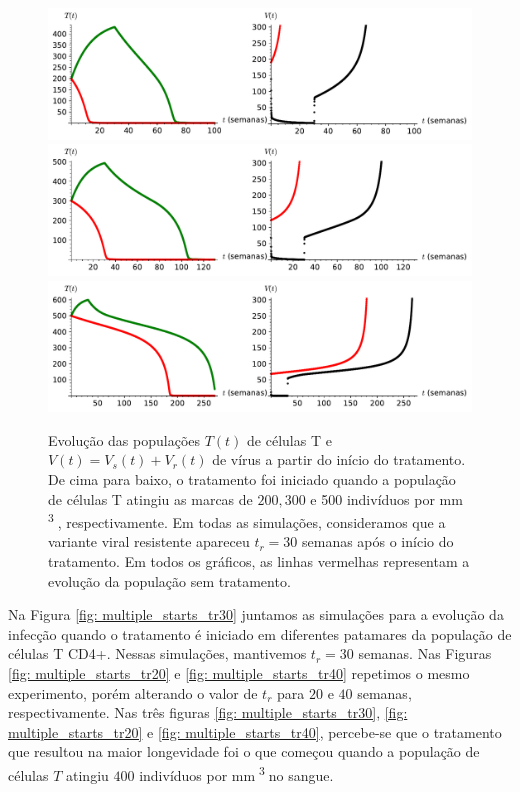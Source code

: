 \begin{figure}[ht!]
    \includegraphics[width=\textwidth]{./figuras/start_treatment_at_T_200.pdf}
    \includegraphics[width=\textwidth]{./figuras/start_treatment_at_T_300.pdf}
    \includegraphics[width=\textwidth]{./figuras/start_treatment_at_T_500.pdf}
    \caption{ Evolução das populações \( T ( t ) \) de células T e \( V ( t ) = V_{ s } ( t ) + V_{ r } ( t ) \) de vírus a partir do início do tratamento.
    De cima para baixo, o tratamento foi iniciado quando a população de células T atingiu as marcas de \( 200, 300 \) e 500 indivíduos por \unit{mm^{ 3 }}, respectivamente.
    Em todas as simulações, consideramos que a variante viral resistente apareceu \( t_{ r } = 30 \) semanas após o início do tratamento.
    Em todos os gráficos, as linhas vermelhas representam a evolução da população sem tratamento.}
    \label{fig: treat_both_pops}
\end{figure}

Na Figura \ref{fig: multiple_starts_tr30} juntamos as simulações para a evolução da infecção quando o tratamento é iniciado em diferentes patamares da população de células T CD4+.
Nessas simulações, mantivemos \( t_{ r } = 30 \) semanas.
Nas Figuras \ref{fig: multiple_starts_tr20} e \ref{fig: multiple_starts_tr40} repetimos o mesmo experimento, porém alterando o valor de \( t_{ r } \) para \( 20 \) e \( 40 \) semanas, respectivamente.
Nas três figuras \ref{fig: multiple_starts_tr30}, \ref{fig: multiple_starts_tr20} e \ref{fig: multiple_starts_tr40}, percebe-se que o tratamento que resultou na maior longevidade foi o que começou quando a população de células \( T \) atingiu \( 400 \) indivíduos por \unit{mm^{ 3 }} no sangue.

